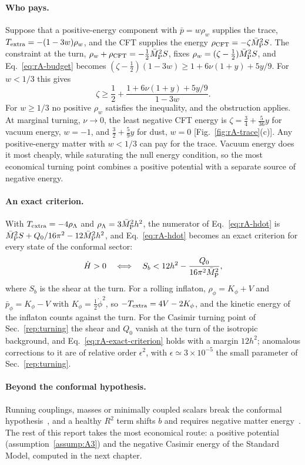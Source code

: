 \paragraph{Who pays.}
Suppose that a positive-energy component with $\bar p=w\rho_w$ supplies the trace, $T_{\rm extra}=-(1-3w)\rho_w$, and the CFT supplies the energy $\rho_{\rm CFT}=-\zeta\bar M_{\mathrm{P}}^2S$.
The constraint at the turn, $\rho_w+\rho_{\rm CFT}=-\tfrac12\bar M_{\mathrm{P}}^2S$, fixes $\rho_w=(\zeta-\tfrac12)\bar M_{\mathrm{P}}^2S$, and Eq.~\eqref{eq:rA-budget} becomes $(\zeta-\tfrac12)(1-3w)\geq1+6\nu(1+y)+5y/9$.
For $w<1/3$ this gives
\begin{equation}
\zeta\geq\frac12+\frac{1+6\nu(1+y)+5y/9}{1-3w}.
\label{eq:rA-joint}
\end{equation}
For $w\geq1/3$ no positive $\rho_w$ satisfies the inequality, and the obstruction applies.
At marginal turning, $\nu\to0$, the least negative CFT energy is $\zeta=\tfrac34+\tfrac{5}{36}y$ for vacuum energy, $w=-1$, and $\tfrac32+\tfrac59y$ for dust, $w=0$ [Fig.~\ref{fig:rA-trace}(c)]. %
Any positive-energy matter with $w<1/3$ can pay for the trace.
Vacuum energy does it most cheaply, while saturating the null energy condition, so the most economical turning point combines a positive potential with a separate source of negative energy.

\paragraph{An exact criterion.}
With $T_{\rm extra}=-4\rho_\Lambda$ and $\rho_\Lambda=3\bar M_{\mathrm{P}}^2h^2$, the numerator of Eq.~\eqref{eq:rA-hdot} is $\bar M_{\mathrm{P}}^2S+Q_0/16\pi^2-12\bar M_{\mathrm{P}}^2h^2$, and Eq.~\eqref{eq:rA-hdot} becomes an exact criterion for every state of the conformal sector:
\begin{equation}
\dot H>0\quad\Longleftrightarrow\quad S_b<12h^2-\frac{Q_0}{16\pi^2\bar M_{\mathrm{P}}^2},
\label{eq:rA-exact-criterion}
\end{equation}
where $S_b$ is the shear at the turn.
For a rolling inflaton, $\rho_\phi=K_\phi+V$ and $\bar p_\phi=K_\phi-V$ with $K_\phi=\tfrac12\dot\phi^2$, so $-T_{\rm extra}=4V-2K_\phi$, and the kinetic energy of the inflaton counts against the turn.
For the Casimir turning point of Sec.~\ref{rep:turning} the shear and $Q_0$ vanish at the turn of the isotropic background, and Eq.~\eqref{eq:rA-exact-criterion} holds with a margin $12h^2$; anomalous corrections to it are of relative order $\epsilon^2$, with $\epsilon\simeq3\times10^{-5}$ the small parameter of Sec.~\ref{rep:turning}. %

\paragraph{Beyond the conformal hypothesis.}
Running couplings, masses or minimally coupled scalars break the conformal hypothesis~\cite{CesareSilva:2024nym,CesareSilva:2026zne}, and a healthy $R^2$ term shifts $b$ and requires negative matter energy~\cite{Anderson:1983nq,DeFelice:2010aj}.
The rest of this report takes the most economical route: a positive potential (assumption~\ref{assump:A3}) and the negative Casimir energy of the Standard Model, computed in the next chapter.
